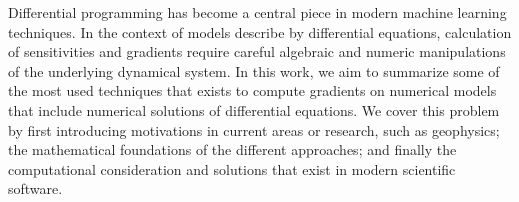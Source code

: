 Differential programming has become a central piece in modern machine learning techniques. 
In the context of models describe by differential equations, calculation of sensitivities and gradients require careful algebraic and numeric manipulations of the underlying dynamical system.
In this work, we aim to summarize some of the most used techniques that exists to compute gradients on numerical models that include numerical solutions of differential equations. 
We cover this problem by first introducing motivations in current areas or research, such as geophysics; the mathematical foundations of the different approaches; and finally the computational consideration and solutions that exist in modern scientific software. 